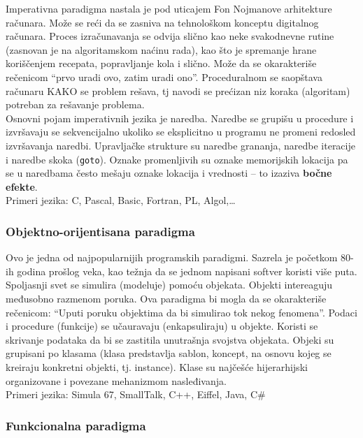 \documentclass[../main.tex]{subfiles}
\begin{document}
Imperativna paradigma nastala je pod uticajem Fon Nojmanove arhitekture računara. Može se reći da se zasniva na tehnološkom konceptu digitalnog računara. Proces izračunavanja se odvija slično kao neke svakodnevne rutine (zasnovan je na algoritamskom naćinu rada), kao što je spremanje hrane koriščenjem recepata, popravljanje kola i slično. Može da se okarakteriše rečenicom ``prvo uradi ovo, zatim uradi ono''. Proceduralnom se saopštava računaru KAKO se problem rešava, tj navodi se prećizan niz koraka (algoritam) potreban za rešavanje problema. \\
Osnovni pojam imperativnih jezika je naredba. Naredbe se grupišu u procedure i izvršavaju se sekvencijalno ukoliko se eksplicitno u programu ne promeni redosled izvršavanja naredbi. Upravljačke strukture su naredbe grananja, naredbe iteracije i naredbe skoka (\texttt{goto}). Oznake promenljivih su oznake memorijskih lokacija pa se u naredbama često mešaju oznake lokacija i vrednosti -- to izaziva {\bf bočne efekte}. \\
Primeri jezika: C, Pascal, Basic, Fortran, PL, Algol,\ldots


\subsubsection{Objektno-orijentisana paradigma}										

Ovo je jedna od najpopularnijih programskih paradigmi. Sazrela je početkom 80-ih godina prošlog veka, kao težnja da se jednom napisani softver koristi više puta. Spoljasnji svet se simulira (modeluje) pomoću objekata. Objekti intereaguju međusobno razmenom poruka. Ova paradigma bi mogla da se okarakteriše rečenicom: ``Uputi poruku objektima da bi simulirao tok nekog fenomena''. Podaci i procedure (funkcije) se učauravaju (enkapsuliraju) u objekte. Koristi se skrivanje podataka da bi se zastitila unutrašnja svojstva objekata. Objeki su grupisani po klasama (klasa predstavlja sablon, koncept, na osnovu kojeg se kreiraju konkretni objekti, tj. instance). Klase su najčešće hijerarhijski organizovane i povezane mehanizmom nasleđivanja.\\
Primeri jezika: Simula 67, SmallTalk, C++, Eiffel, Java, C\#

\subsubsection{Funkcionalna paradigma}											
\end{document}
